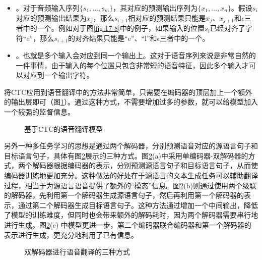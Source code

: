 \begin{itemize}
    \vspace{0.5em}
    \item {\small{}}。对于音频输入序列$\{ s_1,...,s_m \} $，其对应的预测输出序列为$\{x_1,...,x_n \} $。假设$s_i$对应的预测输出结果为$x_j$，那么$s_{i+1}$相对应的预测结果只能是$x_j$、$x_{j+1}$和$\epsilon$三者中的一个。例如对于图\ref{fig:17-8}中的例子，如果输入的位置$s_i$已经对齐了字符“e”，那么$s_{i+1}$的对齐结果只能是“e”、“l”和$\epsilon$三者中的一个。
    \vspace{0.5em}
    \item {\small{}}。也就是多个输入会对应到同一个输出上。这对于语音序列来说是非常自然的一件事情，由于输入的每个位置只包含非常短的语音特征，因此多个输入才可以对应到一个输出字符。
    \vspace{0.5em}
\end{itemize}

\parinterval 将CTC应用到语音翻译中的方法非常简单，只需要在编码器的顶层加上一个额外的输出层即可（图\ref{fig:17-9}）。通过这种方式，不需要增加过多的参数，就可以给模型加入一个较强的监督信息。

\begin{figure}[htp]
\centering

\caption{基于CTC的语音翻译模型}
\label{fig:17-9}
\end{figure}

\parinterval 另外一种多任务学习的思想是通过两个解码器，分别预测语音对应的源语言句子和目标语言句子，具体有图\ref{fig:17-10}展示的三种方式。图\ref{fig:17-10}(a)中采用单编码器-双解码器的方式，两个解码器根据编码器的表示，分别预测源语言句子和目标语言句子，从而使编码器训练地更加充分。这种做法的好处在于源语言的文本生成任务可以辅助翻译过程，相当于为源语言语音提供了额外的“模态”信息。图\ref{fig:17-10}(b)则通过使用两个级联的解码器，先利用第一个解码器生成源语言句子，然后再利用第一个解码器的表示，通过第二个解码器生成目标语言句子。这种方法通过增加一个中间输出，降低了模型的训练难度，但同时也会带来额外的解码耗时，因为两个解码器需要串行地进行生成。图\ref{fig:17-10}(c) 中模型更进一步，第二个编码器联合编码器和第一个解码器的表示进行生成，更充分地利用了已有信息。
\begin{figure}[htp]
\centering

\caption{双解码器进行语音翻译的三种方式}
\label{fig:17-10}
\end{figure}


